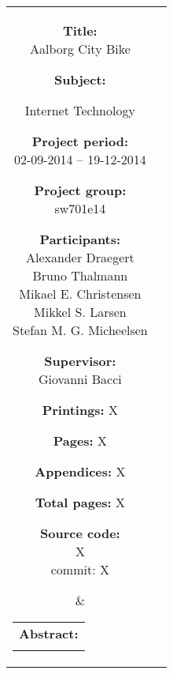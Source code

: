\begin{titlepage}
\begin{nopagebreak}
{\begin{tabular}{cc}
	\parbox{8cm}{
	\begin{description}
		\item { \textbf{Title:}}\\
			Aalborg City Bike
    		\item { \textbf{Subject:}}\\
			\raggedright Internet Technology
		\item { \textbf{Project period:}}\\
			02-09-2014 -- 19-12-2014
 		\hspace{4cm}
		\item { \textbf{Project group:}}\\
  			sw701e14
 		\hspace{4cm}
		\item {\textbf{Participants:}}\\
			Alexander Draegert\\
			Bruno Thalmann\\
			Mikael E. Christensen\\
			Mikkel S. Larsen\\
			Stefan M. G. Micheelsen
		\item { \textbf{Supervisor:}}\\
 			Giovanni Bacci
		\item { \textbf{Printings:} X }
		\item { \textbf{Pages:} X } 
		\item { \textbf{Appendices:} X }
		\item { \textbf{Total pages:} X }
		\item { \textbf{Source code:}\\ {\small X \\ commit: X}}
	\end{description}
	\vfill } &
	\parbox{6.5cm}{
 	 \vspace{.15cm}
  	\hfill 
  	\begin{tabular}{l}
  		{ \textbf{Abstract:}}\bigskip \\
  		\fbox{
  		\parbox{6cm}{\bigskip
     		{\vfill{\footnotesize 
     		\bigskip}}
     	}}
   	\end{tabular}}
\end{tabular}
}%
\\
\vfill
\begin{center}
\end{center}
\end{nopagebreak}
\end{titlepage}